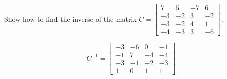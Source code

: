 
\begin{exerciseStatement}


Show how to find the inverse of the matrix \(C= \left[\begin{array}{cccc}
7 & 5 & -7 & 6 \\
-3 & -2 & 3 & -2 \\
-3 & -2 & 4 & 1 \\
-4 & -3 & 3 & -6
\end{array}\right] \).


\end{exerciseStatement}
    
\begin{exerciseAnswer} 
\[C^{-1}= \left[\begin{array}{cccc}
-3 & -6 & 0 & -1 \\
-1 & 7 & -4 & -4 \\
-3 & -1 & -2 & -3 \\
1 & 0 & 1 & 1
\end{array}\right] \]
\end{exerciseAnswer}
    
